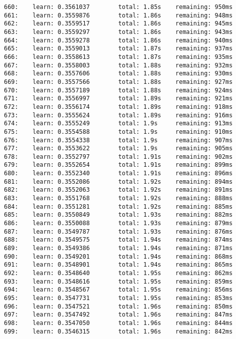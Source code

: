 \documentclass[11pt]{article}
\begin{document}
\begin{Verbatim}[commandchars=\\\{\}]
660:    learn: 0.3561037        total: 1.85s    remaining: 950ms
661:    learn: 0.3559876        total: 1.86s    remaining: 948ms
662:    learn: 0.3559517        total: 1.86s    remaining: 945ms
663:    learn: 0.3559297        total: 1.86s    remaining: 943ms
664:    learn: 0.3559278        total: 1.86s    remaining: 940ms
665:    learn: 0.3559013        total: 1.87s    remaining: 937ms
666:    learn: 0.3558613        total: 1.87s    remaining: 935ms
667:    learn: 0.3558003        total: 1.88s    remaining: 932ms
668:    learn: 0.3557606        total: 1.88s    remaining: 930ms
669:    learn: 0.3557566        total: 1.88s    remaining: 927ms
670:    learn: 0.3557189        total: 1.88s    remaining: 924ms
671:    learn: 0.3556997        total: 1.89s    remaining: 921ms
672:    learn: 0.3556174        total: 1.89s    remaining: 918ms
673:    learn: 0.3555624        total: 1.89s    remaining: 916ms
674:    learn: 0.3555249        total: 1.9s     remaining: 913ms
675:    learn: 0.3554588        total: 1.9s     remaining: 910ms
676:    learn: 0.3554338        total: 1.9s     remaining: 907ms
677:    learn: 0.3553622        total: 1.9s     remaining: 905ms
678:    learn: 0.3552797        total: 1.91s    remaining: 902ms
679:    learn: 0.3552654        total: 1.91s    remaining: 899ms
680:    learn: 0.3552340        total: 1.91s    remaining: 896ms
681:    learn: 0.3552086        total: 1.92s    remaining: 894ms
682:    learn: 0.3552063        total: 1.92s    remaining: 891ms
683:    learn: 0.3551768        total: 1.92s    remaining: 888ms
684:    learn: 0.3551281        total: 1.92s    remaining: 885ms
685:    learn: 0.3550849        total: 1.93s    remaining: 882ms
686:    learn: 0.3550088        total: 1.93s    remaining: 879ms
687:    learn: 0.3549787        total: 1.93s    remaining: 876ms
688:    learn: 0.3549575        total: 1.94s    remaining: 874ms
689:    learn: 0.3549386        total: 1.94s    remaining: 871ms
690:    learn: 0.3549201        total: 1.94s    remaining: 868ms
691:    learn: 0.3548901        total: 1.94s    remaining: 865ms
692:    learn: 0.3548640        total: 1.95s    remaining: 862ms
693:    learn: 0.3548616        total: 1.95s    remaining: 859ms
694:    learn: 0.3548567        total: 1.95s    remaining: 856ms
695:    learn: 0.3547731        total: 1.95s    remaining: 853ms
696:    learn: 0.3547521        total: 1.96s    remaining: 850ms
697:    learn: 0.3547492        total: 1.96s    remaining: 847ms
698:    learn: 0.3547050        total: 1.96s    remaining: 844ms
699:    learn: 0.3546315        total: 1.96s    remaining: 842ms

\end{Verbatim}
\end{document}

